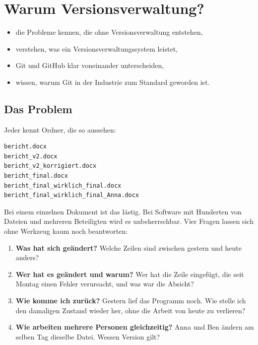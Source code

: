 \chapter{Warum Versionsverwaltung?}
\label{kap:warum}

\begin{lernziele}
\begin{itemize}[nosep]
  \item die Probleme kennen, die ohne Versionsverwaltung entstehen,
  \item verstehen, was ein Versionsverwaltungssystem leistet,
  \item Git und GitHub klar voneinander unterscheiden,
  \item wissen, warum Git in der Industrie zum Standard geworden ist.
\end{itemize}
\end{lernziele}

\section{Das Problem}

Jeder kennt Ordner, die so aussehen:

\begin{lstlisting}[style=ausgabe]
bericht.docx
bericht_v2.docx
bericht_v2_korrigiert.docx
bericht_final.docx
bericht_final_wirklich_final.docx
bericht_final_wirklich_final_Anna.docx
\end{lstlisting}

Bei einem einzelnen Dokument ist das lästig. Bei Software mit Hunderten von Dateien und
mehreren Beteiligten wird es unbeherrschbar. Vier Fragen lassen sich ohne Werkzeug kaum
noch beantworten:

\begin{enumerate}
  \item \textbf{Was hat sich geändert?} Welche Zeilen sind zwischen gestern und heute anders?
  \item \textbf{Wer hat es geändert und warum?} Wer hat die Zeile eingefügt, die seit Montag
        einen Fehler verursacht, und was war die Absicht?
  \item \textbf{Wie komme ich zurück?} Gestern lief das Programm noch. Wie stelle ich den
        damaligen Zustand wieder her, ohne die Arbeit von heute zu verlieren?
  \item \textbf{Wie arbeiten mehrere Personen gleichzeitig?} Anna und Ben ändern am selben
        Tag dieselbe Datei. Wessen Version gilt?
\end{enumerate}

